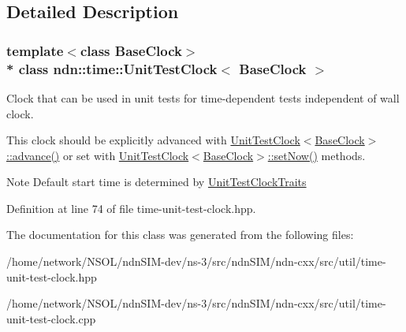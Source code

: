 \subsection{Detailed Description}
\subsubsection*{template$<$class Base\+Clock$>$\\*
class ndn\+::time\+::\+Unit\+Test\+Clock$<$ Base\+Clock $>$}

Clock that can be used in unit tests for time-\/dependent tests independent of wall clock. 

This clock should be explicitly advanced with \hyperlink{classndn_1_1time_1_1UnitTestClock_adc17792822d600b77b7a5b59e285a59f}{Unit\+Test\+Clock$<$\+Base\+Clock$>$\+::advance()} or set with \hyperlink{classndn_1_1time_1_1UnitTestClock_a9b84b834f21257f7cfd43fa30c8147ef}{Unit\+Test\+Clock$<$\+Base\+Clock$>$\+::set\+Now()} methods.

\begin{DoxyNote}{Note}
Default start time is determined by \hyperlink{classndn_1_1time_1_1UnitTestClockTraits}{Unit\+Test\+Clock\+Traits} 
\end{DoxyNote}


Definition at line 74 of file time-\/unit-\/test-\/clock.\+hpp.



The documentation for this class was generated from the following files\+:\begin{DoxyCompactItemize}
\item 
/home/network/\+N\+S\+O\+L/ndn\+S\+I\+M-\/dev/ns-\/3/src/ndn\+S\+I\+M/ndn-\/cxx/src/util/time-\/unit-\/test-\/clock.\+hpp\item 
/home/network/\+N\+S\+O\+L/ndn\+S\+I\+M-\/dev/ns-\/3/src/ndn\+S\+I\+M/ndn-\/cxx/src/util/time-\/unit-\/test-\/clock.\+cpp\end{DoxyCompactItemize}
